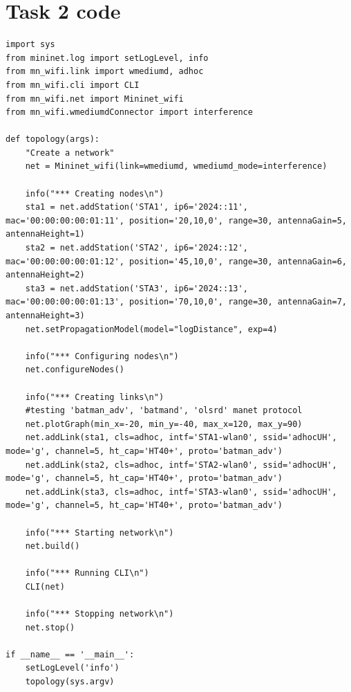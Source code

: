 \documentclass{article}
\begin{document}
\newpage
\section{Task 2 code}
\begin{lstlisting}
import sys
from mininet.log import setLogLevel, info
from mn_wifi.link import wmediumd, adhoc
from mn_wifi.cli import CLI
from mn_wifi.net import Mininet_wifi
from mn_wifi.wmediumdConnector import interference

def topology(args):
    "Create a network"
    net = Mininet_wifi(link=wmediumd, wmediumd_mode=interference) 

    info("*** Creating nodes\n")
    sta1 = net.addStation('STA1', ip6='2024::11', mac='00:00:00:00:01:11', position='20,10,0', range=30, antennaGain=5, antennaHeight=1)
    sta2 = net.addStation('STA2', ip6='2024::12', mac='00:00:00:00:01:12', position='45,10,0', range=30, antennaGain=6, antennaHeight=2)
    sta3 = net.addStation('STA3', ip6='2024::13', mac='00:00:00:00:01:13', position='70,10,0', range=30, antennaGain=7, antennaHeight=3)
    net.setPropagationModel(model="logDistance", exp=4)

    info("*** Configuring nodes\n")
    net.configureNodes()

    info("*** Creating links\n")
    #testing 'batman_adv', 'batmand', 'olsrd' manet protocol
    net.plotGraph(min_x=-20, min_y=-40, max_x=120, max_y=90)
    net.addLink(sta1, cls=adhoc, intf='STA1-wlan0', ssid='adhocUH', mode='g', channel=5, ht_cap='HT40+', proto='batman_adv')
    net.addLink(sta2, cls=adhoc, intf='STA2-wlan0', ssid='adhocUH', mode='g', channel=5, ht_cap='HT40+', proto='batman_adv')
    net.addLink(sta3, cls=adhoc, intf='STA3-wlan0', ssid='adhocUH', mode='g', channel=5, ht_cap='HT40+', proto='batman_adv')
    
    info("*** Starting network\n")
    net.build()

    info("*** Running CLI\n")
    CLI(net)

    info("*** Stopping network\n")
    net.stop()

if __name__ == '__main__':
    setLogLevel('info')
    topology(sys.argv)
\end{lstlisting}

\newpage
\end{document}
